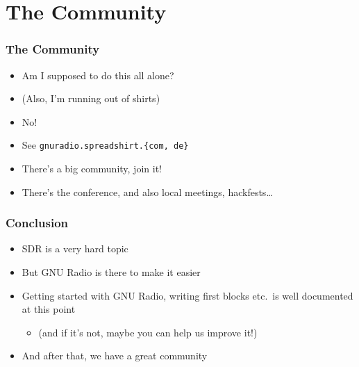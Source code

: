 \documentclass{beamer}
\begin{document}
\section{The Community}
\begin{frame}
  \frametitle{The Community}
  \begin{itemize}
    \item Am I supposed to do this all alone?
    \item (Also, I'm running out of shirts)
    \item<2-> No!
    \item<2-> See \texttt{gnuradio.spreadshirt.\{com, de\}}
    \item<3-> There's a big community, join it!
    \item<3-> There's the conference, and also local meetings, hackfests\ldots
  \end{itemize}
\end{frame}

\begin{frame}
  \frametitle{Conclusion}
  \begin{itemize}
    \item SDR is a very hard topic
    \item But GNU Radio is there to make it easier
    \item Getting started with GNU Radio, writing first blocks etc.\ is well documented at this point
      \begin{itemize}
        \item (and if it's not, maybe you can help us improve it!)
      \end{itemize}
    \item And after that, we have a great community
  \end{itemize}
\end{frame}
\end{document}
